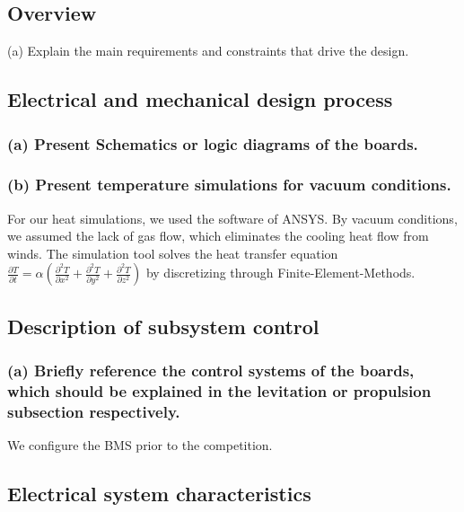 \subsection{Overview}
(a) Explain the main requirements and constraints that drive the design. \\


\subsection{Electrical and mechanical design process}
\subsubsection{(a) Present Schematics or logic diagrams of the boards.}
\subsubsection{(b) Present temperature simulations for vacuum conditions.}
For our heat simulations, we used the software of ANSYS. By vacuum conditions, we assumed the
lack of gas flow, which eliminates the cooling heat flow from winds. The simulation tool solves
the heat transfer equation \( \frac{\partial T}{\partial t} = \alpha \left( \frac{\partial^2 T}{\partial x^2} + \frac{\partial^2 T}{\partial y^2} + \frac{\partial^2 T}{\partial z^2} \right) \)
by discretizing through Finite-Element-Methods.

\subsection{Description of subsystem control}
\subsubsection{(a) Briefly reference the control systems of the boards, which should be explained in the levitation or propulsion subsection respectively.}
We configure the BMS prior to the competition. \\


\subsection{Electrical system characteristics}
   


